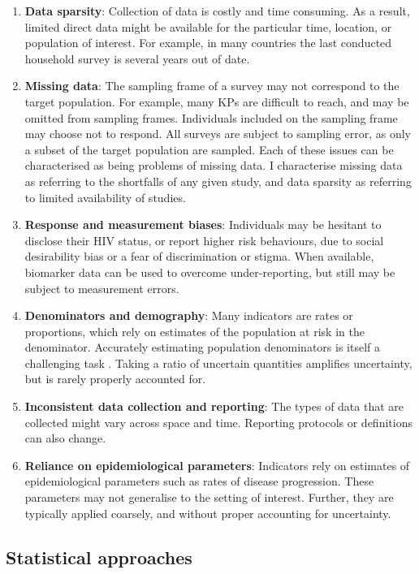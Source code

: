 \documentclass[a4paper, nobind]{templates/ociamthesis}
\begin{document}
\begin{enumerate}
\def\labelenumi{\arabic{enumi}.}
\item
  \textbf{Data sparsity}:
  Collection of data is costly and time consuming.
  As a result, limited direct data might be available for the particular time, location, or population of interest.
  For example, in many countries the last conducted household survey is several years out of date.
\item
  \textbf{Missing data}:
  The sampling frame of a survey may not correspond to the target population.
  For example, many KPs are difficult to reach, and may be omitted from sampling frames.
  Individuals included on the sampling frame may choose not to respond.
  All surveys are subject to sampling error, as only a subset of the target population are sampled.
  Each of these issues can be characterised as being problems of missing data.
  I characterise missing data as referring to the shortfalls of any given study, and data sparsity as referring to limited availability of studies.
\item
  \textbf{Response and measurement biases}:
  Individuals may be hesitant to disclose their HIV status, or report higher risk behaviours, due to social desirability bias or a fear of discrimination or stigma.
  When available, biomarker data can be used to overcome under-reporting, but still may be subject to measurement errors.
\item
  \textbf{Denominators and demography}:
  Many indicators are rates or proportions, which rely on estimates of the population at risk in the denominator.
  Accurately estimating population denominators is itself a challenging task \autocite{tatem2017worldpop}.
  Taking a ratio of uncertain quantities amplifies uncertainty, but is rarely properly accounted for.
\item
  \textbf{Inconsistent data collection and reporting}:
  The types of data that are collected might vary across space and time.
  Reporting protocols or definitions can also change.
\item
  \textbf{Reliance on epidemiological parameters}:
  Indicators rely on estimates of epidemiological parameters such as rates of disease progression.
  These parameters may not generalise to the setting of interest.
  Further, they are typically applied coarsely, and without proper accounting for uncertainty.
\end{enumerate}

\hypertarget{statistical-approaches}{%
\subsection{Statistical approaches}\label{statistical-approaches}}
\end{document}

